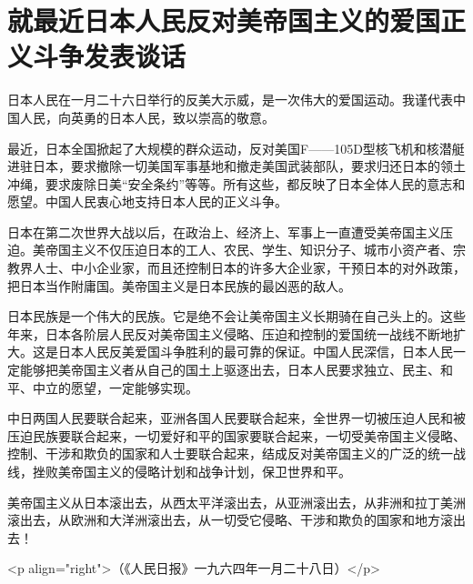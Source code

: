 \section[就最近日本人民反对美帝国主义的爱国正义斗争发表谈话（一九六四年一月二十七日）]{就最近日本人民反对美帝国主义的爱国正义斗争发表谈话}


日本人民在一月二十六日举行的反美大示威，是一次伟大的爱国运动。我谨代表中国人民，向英勇的日本人民，致以崇高的敬意。

最近，日本全国掀起了大规模的群众运动，反对美国F——105D型核飞机和核潜艇进驻日本，要求撤除一切美国军事基地和撤走美国武装部队，要求归还日本的领土冲绳，要求废除日美“安全条约”等等。所有这些，都反映了日本全体人民的意志和愿望。中国人民衷心地支持日本人民的正义斗争。

日本在第二次世界大战以后，在政治上、经济上、军事上一直遭受美帝国主义压迫。美帝国主义不仅压迫日本的工人、农民、学生、知识分子、城市小资产者、宗教界人士、中小企业家，而且还控制日本的许多大企业家，干预日本的对外政策，把日本当作附庸国。美帝国主义是日本民族的最凶恶的敌人。

日本民族是一个伟大的民族。它是绝不会让美帝国主义长期骑在自己头上的。这些年来，日本各阶层人民反对美帝国主义侵略、压迫和控制的爱国统一战线不断地扩大。这是日本人民反美爱国斗争胜利的最可靠的保证。中国人民深信，日本人民一定能够把美帝国主义者从自己的国土上驱逐出去，日本人民要求独立、民主、和平、中立的愿望，一定能够实现。

中日两国人民要联合起来，亚洲各国人民要联合起来，全世界一切被压迫人民和被压迫民族要联合起来，一切爱好和平的国家要联合起来，一切受美帝国主义侵略、控制、干涉和欺负的国家和人士要联合起来，结成反对美帝国主义的广泛的统一战线，挫败美帝国主义的侵略计划和战争计划，保卫世界和平。

美帝国主义从日本滚出去，从西太平洋滚出去，从亚洲滚出去，从非洲和拉丁美洲滚出去，从欧洲和大洋洲滚出去，从一切受它侵略、干涉和欺负的国家和地方滚出去！

<p align="right">（《人民日报》一九六四年一月二十八日）</p>


